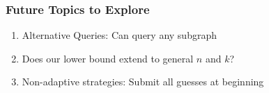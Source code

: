 \documentclass{beamer}
\begin{document}
    


    \begin{frame}
    \frametitle{Future Topics to Explore}
    	\begin{enumerate}[label=\roman*.]
		\item Alternative Queries: Can query any subgraph
		\item Does our lower bound extend to general $n$ and $k$?
		\item Non-adaptive strategies: Submit all guesses at beginning
		\end{enumerate}
    \end{frame}
\end{document}
